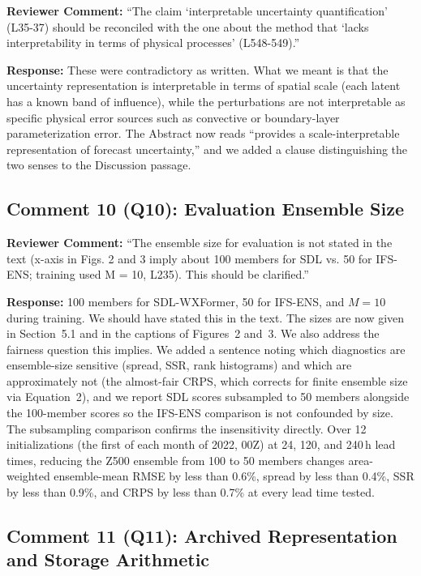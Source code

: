 \documentclass[12pt]{article}
\begin{document}
\textbf{Reviewer Comment:} ``The claim `interpretable uncertainty quantification'
(L35-37) should be reconciled with the one about the method that `lacks
interpretability in terms of physical processes' (L548-549).''

\textbf{Response:} These were contradictory as written. What we meant is that the
uncertainty representation is interpretable in terms of spatial scale (each latent
has a known band of influence), while the perturbations are not interpretable as
specific physical error sources such as convective or boundary-layer parameterization
error. The Abstract now reads ``provides a scale-interpretable representation of
forecast uncertainty,'' and we added a clause distinguishing the two senses to
the Discussion passage.

\subsection*{Comment 10 (Q10): Evaluation Ensemble Size}

\textbf{Reviewer Comment:} ``The ensemble size for evaluation is not stated in the
text (x-axis in Figs. 2 and 3 imply about 100 members for SDL vs. 50 for IFS-ENS;
training used M = 10, L235). This should be clarified.''

\textbf{Response:} 100 members for SDL-WXFormer, 50 for IFS-ENS, and $M=10$ during
training. We should have stated this in the text. The sizes are now given in
Section~5.1 and in the captions of Figures~2 and~3. We also address the fairness question this implies. We added a sentence
noting which diagnostics are ensemble-size sensitive (spread, SSR, rank histograms)
and which are approximately not (the almost-fair CRPS, which corrects for finite
ensemble size via Equation~2), and we report SDL scores subsampled to 50 members
alongside the 100-member scores so the IFS-ENS comparison is not confounded by size.
The subsampling comparison confirms the insensitivity directly. Over 12
initializations (the first of each month of 2022, 00Z) at 24, 120, and 240\,h lead
times, reducing the Z500 ensemble from 100 to 50 members changes area-weighted
ensemble-mean RMSE by less than 0.6\%, spread by less than 0.4\%, SSR by less than
0.9\%, and CRPS by less than 0.7\% at every lead time tested.

\subsection*{Comment 11 (Q11): Archived Representation and Storage Arithmetic}
\end{document}
